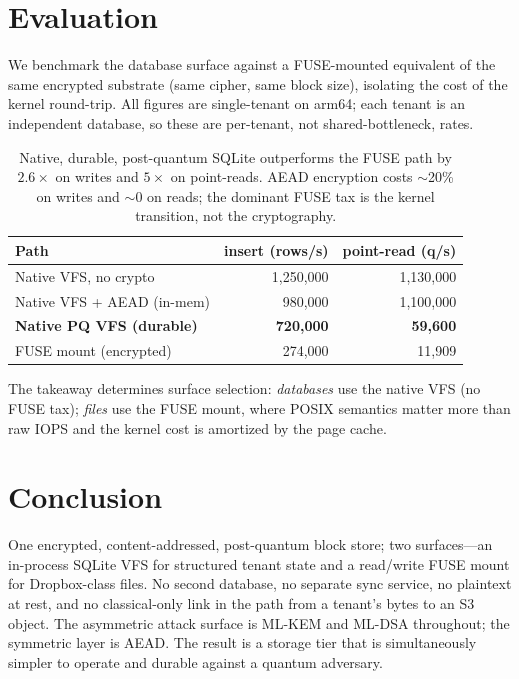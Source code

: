 \documentclass[11pt,twocolumn]{article}
\begin{document}
\section{Evaluation}
We benchmark the database surface against a FUSE-mounted equivalent of the same
encrypted substrate (same cipher, same block size), isolating the cost of the
kernel round-trip. All figures are single-tenant on arm64; each tenant is an
independent database, so these are per-tenant, not shared-bottleneck, rates.

\begin{table}[h]\centering\small
\begin{tabular}{lrr}
\toprule
Path & insert (rows/s) & point-read (q/s) \\
\midrule
Native VFS, no crypto & 1{,}250{,}000 & 1{,}130{,}000 \\
Native VFS + AEAD (in-mem) & 980{,}000 & 1{,}100{,}000 \\
\textbf{Native PQ VFS (durable)} & \textbf{720{,}000} & \textbf{59{,}600} \\
FUSE mount (encrypted) & 274{,}000 & 11{,}909 \\
\bottomrule
\end{tabular}
\caption{Native, durable, post-quantum SQLite outperforms the FUSE path by
$2.6\times$ on writes and $5\times$ on point-reads. AEAD encryption costs
$\sim$20\% on writes and $\sim$0 on reads; the dominant FUSE tax is the kernel
transition, not the cryptography.}
\end{table}

The takeaway determines surface selection: \emph{databases} use the native VFS
(no FUSE tax); \emph{files} use the FUSE mount, where POSIX semantics matter more
than raw IOPS and the kernel cost is amortized by the page cache.

\section{Conclusion}
One encrypted, content-addressed, post-quantum block store; two surfaces---an
in-process SQLite VFS for structured tenant state and a read/write FUSE mount for
Dropbox-class files. No second database, no separate sync service, no plaintext
at rest, and no classical-only link in the path from a tenant's bytes to an S3
object. The asymmetric attack surface is ML-KEM and ML-DSA throughout; the
symmetric layer is AEAD. The result is a storage tier that is simultaneously
simpler to operate and durable against a quantum adversary.
\end{document}
